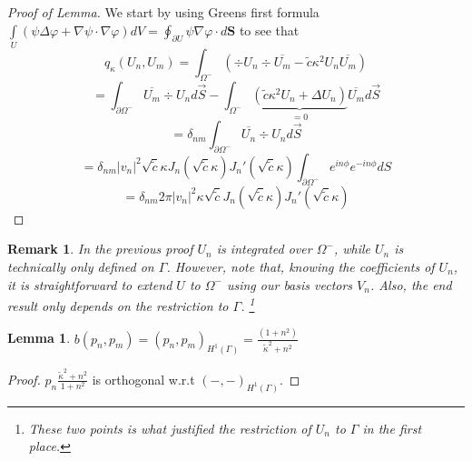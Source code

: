 \documentclass[10pt,journal,compsoc, onecolumn]{IEEEtran}
\newtheorem{lemma}[theorem]{Lemma}
\newtheorem{remark}[theorem]{Remark}
\begin{document}
\begin{proof}[Proof of Lemma]
    We start by using Greens first formula 
    \(\int\limits_{U}(\psi \Delta \varphi+\nabla \psi \cdot \nabla \varphi) d V=\oint_{\partial U} \psi \nabla \varphi \cdot d \mathbf{S}\)
    to see that $$q_\kappa(U_n, U_m) = \int_{\Omega^-} ( \div U_n \div \overline{U_m} -  \tilde c\kappa^2U_n \overline{U_m}) $$
    $$
        = \int_{ \partial \Omega^-} \overline{U_m} \div U_n d \vec{S} - \int_{\Omega^{-}} \underbrace{( \tilde c\kappa^2 U_n + \Delta U_n)}_{=0} \overline{U_m} d \vec{S} 
    $$
    $$
        = \delta_{nm}\int_{ \partial \Omega^-} \overline{U_n} \div U_n d \vec{S}
    $$
    $$
        = \delta_{nm}|v_n|^2 \sqrt{ \tilde c} \kappa  J_n(\sqrt{ \tilde c}\kappa ) J_n'(\sqrt{ \tilde c}\kappa )  \int_{\partial \Omega^-} e^{in\phi}  e^{-in\phi} dS
    $$
    $$
        = \delta_{nm}2\pi |v_n|^2\kappa \sqrt{ \tilde c} J_n(\sqrt{ \tilde c} \kappa ) J_n'(\sqrt{ \tilde c} \kappa )
    $$
\end{proof}

\begin{remark}
    In the previous proof $U_n$ is integrated over $\Omega^-$, while $U_n$ is technically only defined on $\Gamma$. 
    However, note that, knowing the coefficients of $U_n$, it is straightforward to extend $U$ to $\Omega^-$ using our basis vectors $V_n$. 
    Also, the end result only depends on the restriction to $\Gamma$.
    \footnote{These two points is what justified the restriction of $U_n$ to $\Gamma$ in the first place.}
\end{remark}

\begin{lemma}
    $b(p_n, p_m) =  (p_n, p_m)_{H^1(\Gamma)} = \frac{(1 + n^2)}{\tilde \kappa^2 + n^2}$
\end{lemma}
\begin{proof}
    $p_n\frac{\tilde \kappa^2 + n^2}{1 + n^2}$ is orthogonal w.r.t $(-, -)_{H^1(\Gamma)}$.
\end{proof}
   
\end{document}
